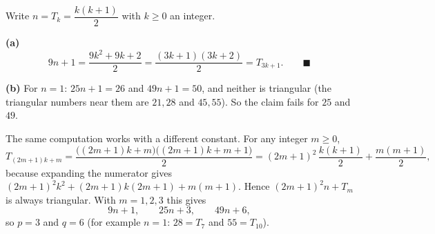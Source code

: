 Write $n=T_k=\dfrac{k(k+1)}{2}$ with $k\ge0$ an integer.

\textbf{(a)}
\[
9n+1=\dfrac{9k^2+9k+2}{2}=\dfrac{(3k+1)(3k+2)}{2}=T_{3k+1}. \qquad\blacksquare
\]

\textbf{(b)} For $n=1$: $25n+1=26$ and $49n+1=50$, and neither is triangular (the triangular numbers near them are $21,28$ and $45,55$). So the claim fails for $25$ and $49$.

The same computation works with a different constant. For any integer $m\ge0$,
\[
T_{(2m+1)k+m}=\dfrac{\bigl((2m+1)k+m\bigr)\bigl((2m+1)k+m+1\bigr)}{2}=(2m+1)^2\,\dfrac{k(k+1)}{2}+\dfrac{m(m+1)}{2},
\]
because expanding the numerator gives $(2m+1)^2k^2+(2m+1)k(2m+1)+m(m+1)$. Hence $(2m+1)^2n+T_m$ is always triangular. With $m=1,2,3$ this gives
\[
9n+1,\qquad \boxed{25n+3},\qquad \boxed{49n+6},
\]
so $p=3$ and $q=6$ (for example $n=1$: $28=T_7$ and $55=T_{10}$).
